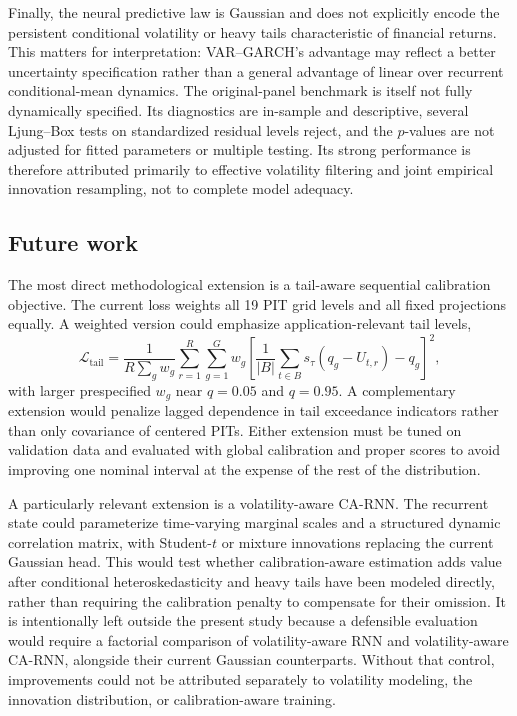 \documentclass[11pt]{article}
\begin{document}
Finally, the neural predictive law is Gaussian and does not explicitly encode
the persistent conditional volatility or heavy tails characteristic of financial
returns. This matters for interpretation: VAR--GARCH's advantage may reflect a
better uncertainty specification rather than a general advantage of linear over
recurrent conditional-mean dynamics. The original-panel benchmark is itself not
fully dynamically specified. Its diagnostics are in-sample and descriptive,
several Ljung--Box tests on standardized residual levels reject, and the
$p$-values are not adjusted for fitted parameters or multiple testing. Its strong
performance is therefore attributed primarily to effective volatility filtering
and joint empirical innovation resampling, not to complete model adequacy.

\subsection{Future work}

The most direct methodological extension is a tail-aware sequential calibration
objective. The current loss weights all 19 PIT grid levels and all fixed
projections equally. A weighted version could emphasize application-relevant tail
levels,
\begin{equation}
 \mathcal L_{\mathrm{tail}}
 =\frac{1}{R\sum_g w_g}\sum_{r=1}^R\sum_{g=1}^G w_g
 \left[\frac{1}{|B|}\sum_{t\in B}s_\tau(q_g-U_{t,r})-q_g\right]^2,
 \label{eq:tail-calibration}
\end{equation}
with larger prespecified $w_g$ near $q=0.05$ and $q=0.95$. A complementary
extension would penalize lagged dependence in tail exceedance indicators rather
than only covariance of centered PITs. Either extension must be tuned on
validation data and evaluated with global calibration and proper scores to avoid
improving one nominal interval at the expense of the rest of the distribution.

A particularly relevant extension is a volatility-aware CA-RNN. The recurrent
state could parameterize time-varying marginal scales and a structured dynamic
correlation matrix, with Student-$t$ or mixture innovations replacing the current
Gaussian head. This would test whether calibration-aware estimation adds value
after conditional heteroskedasticity and heavy tails have been modeled directly,
rather than requiring the calibration penalty to compensate for their omission.
It is intentionally left outside the present study because a defensible
evaluation would require a factorial comparison of volatility-aware RNN and
volatility-aware CA-RNN, alongside their current Gaussian counterparts. Without
that control, improvements could not be attributed separately to volatility
modeling, the innovation distribution, or calibration-aware training.
\end{document}
